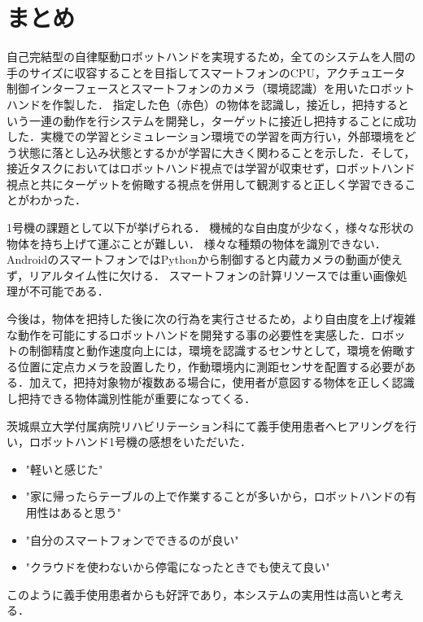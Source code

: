 \section{まとめ}
自己完結型の自律駆動ロボットハンドを実現するため，全てのシステムを人間の手のサイズに収容することを目指してスマートフォンのCPU，アクチュエータ制御インターフェースとスマートフォンのカメラ（環境認識）を用いたロボットハンドを作製した．
指定した色（赤色）の物体を認識し，接近し，把持するという一連の動作を行システムを開発し，ターゲットに接近し把持することに成功した．実機での学習とシミュレーション環境での学習を両方行い，外部環境をどう状態に落とし込み状態とするかが学習に大きく関わることを示した．そして，接近タスクにおいてはロボットハンド視点では学習が収束せず，ロボットハンド視点と共にターゲットを俯瞰する視点を併用して観測すると正しく学習できることがわかった．

1号機の課題として以下が挙げられる．
機械的な自由度が少なく，様々な形状の物体を持ち上げて運ぶことが難しい．
様々な種類の物体を識別できない．
AndroidのスマートフォンではPythonから制御すると内蔵カメラの動画が使えず，リアルタイム性に欠ける．
スマートフォンの計算リソースでは重い画像処理が不可能である．

今後は，物体を把持した後に次の行為を実行させるため，より自由度を上げ複雑な動作を可能にするロボットハンドを開発する事の必要性を実感した．ロボットの制御精度と動作速度向上には，環境を認識するセンサとして，環境を俯瞰する位置に定点カメラを設置したり，作動環境内に測距センサを配置する必要がある．加えて，把持対象物が複数ある場合に，使用者が意図する物体を正しく認識し把持できる物体識別性能が重要になってくる．

茨城県立大学付属病院リハビリテーション科にて義手使用患者へヒアリングを行い，ロボットハンド1号機の感想をいただいた．
\begin{itemize}
    \item "軽いと感じた"
    \item "家に帰ったらテーブルの上で作業することが多いから，ロボットハンドの有用性はあると思う"
    \item "自分のスマートフォンでできるのが良い"
    \item "クラウドを使わないから停電になったときでも使えて良い"
\end{itemize}
このように義手使用患者からも好評であり，本システムの実用性は高いと考える．

